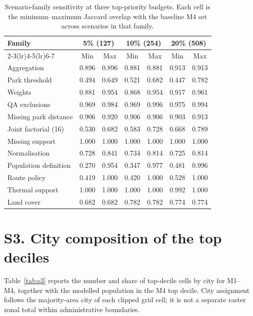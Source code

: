 \documentclass[times,twoside]{_Templates/MultiTargetManuscript}
\begin{document}
\begin{table}[H]
\centering
\small
\caption{Scenario-family sensitivity at three top-priority budgets. Each cell is
the minimum--maximum Jaccard overlap with the baseline M4 set across scenarios in
that family.}
\label{tab:s2}
\begin{tabular}{@{}lcccccc@{}}
\toprule
\multirow{2}{*}{Family} & \multicolumn{2}{c}{5\% (127)} & \multicolumn{2}{c}{10\% (254)} & \multicolumn{2}{c}{20\% (508)} \\
\cmidrule(lr){2-3}\cmidrule(lr){4-5}\cmidrule(lr){6-7}
 & Min & Max & Min & Max & Min & Max \\
\midrule
Aggregation & 0.896 & 0.896 & 0.881 & 0.881 & 0.913 & 0.913 \\
Park threshold & 0.494 & 0.649 & 0.521 & 0.682 & 0.447 & 0.782 \\
Weights & 0.881 & 0.954 & 0.868 & 0.954 & 0.917 & 0.961 \\
QA exclusions & 0.969 & 0.984 & 0.969 & 0.996 & 0.975 & 0.994 \\
Missing park distance & 0.906 & 0.920 & 0.906 & 0.906 & 0.903 & 0.913 \\
Joint factorial (16) & 0.530 & 0.682 & 0.583 & 0.728 & 0.668 & 0.789 \\
Missing support & 1.000 & 1.000 & 1.000 & 1.000 & 1.000 & 1.000 \\
Normalisation & 0.728 & 0.841 & 0.734 & 0.814 & 0.725 & 0.814 \\
Population definition & 0.270 & 0.954 & 0.347 & 0.977 & 0.481 & 0.996 \\
Route policy & 0.419 & 1.000 & 0.420 & 1.000 & 0.528 & 1.000 \\
Thermal support & 1.000 & 1.000 & 1.000 & 1.000 & 0.992 & 1.000 \\
Land cover & 0.682 & 0.682 & 0.782 & 0.782 & 0.774 & 0.774 \\
\bottomrule
\end{tabular}
\end{table}

\section*{S3. City composition of the top deciles}

Table~\ref{tab:s3} reports the number and share of top-decile cells by city for
M1--M4, together with the modelled population in the M4 top decile. City
assignment follows the majority-area city of each clipped grid cell; it is not a
separate raster zonal total within administrative boundaries.
\end{document}
